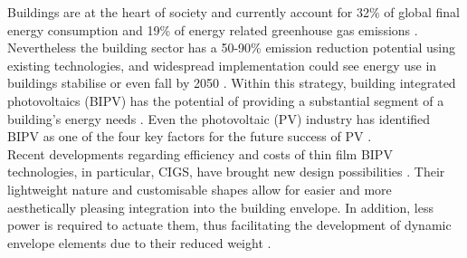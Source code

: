 
Buildings are at the heart of society and currently account for 32\% of global final energy consumption and 19\% of energy related greenhouse gas emissions \cite{IPCC}. Nevertheless the building sector has a 50-90\% emission reduction potential using existing technologies, and widespread implementation could see energy use in buildings stabilise or even fall by 2050 \cite{IPCC}. Within this strategy, building integrated photovoltaics (BIPV) has the potential of providing a substantial segment of a building's energy needs \cite{defaix2012technical}. Even the photovoltaic (PV) industry has identified BIPV as one of the four key factors for the future success of PV \cite{raugei2009life}. \\

Recent developments regarding efficiency and costs of thin film BIPV technologies, in particular, CIGS, have brought new design possibilities \cite{NREL} \cite{kushiya2014cis} \cite{kaelin2004low} \cite{jelle2012building}. Their lightweight nature and customisable shapes allow for easier and more aesthetically pleasing integration into the building envelope. In addition, less power is required to actuate them, thus facilitating the development of dynamic envelope elements due to their reduced weight \cite{rossi2012adaptive}. \\





